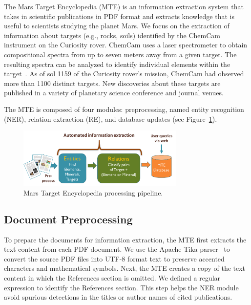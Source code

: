 \documentclass[letterpaper]{article} %
\begin{document}
The Mars Target Encyclopedia (MTE) is an information extraction system
that takes in scientific publications in PDF format and extracts
knowledge that is useful to scientists studying the planet Mars.
%
We focus on the extraction of information about targets (e.g., rocks,
soils) identified by the ChemCam instrument on the Curiosity rover.
ChemCam uses a laser spectrometer to obtain compositional spectra from
up to seven meters away from a given target. The resulting spectra can
be analyzed to identify individual elements within the
target~\cite{maurice:chemcam12}.  As of sol 1159 of the Curiosity
rover's mission, ChemCam had observed more than 1100 distinct targets.
New discoveries about these targets are published in a variety of
planetary science conference and journal venues.

The MTE is composed of four modules: preprocessing, named entity
recognition (NER), relation extraction (RE), and database updates (see
Figure~\ref{fig:mte}).

\begin{figure}
\begin{center}
\includegraphics[width=3.25in]{fig/system.pdf}
\end{center}
\caption{Mars Target Encyclopedia processing pipeline.}
\label{fig:mte}
\end{figure}

\subsection{Document Preprocessing}

To prepare the documents for information extraction, the MTE first
extracts the text content from each PDF document.  We use the Apache
Tika parser~\cite{mattmann:tika11} to convert the source PDF files
into UTF-8 format text to preserve accented characters and
mathematical symbols.
Next, the MTE creates a copy of the text content in which the
References section is omitted.  We defined a regular expression to
identify the References section.
This step helps the NER module avoid spurious detections in the
titles or author names of cited publications.
\end{document}
